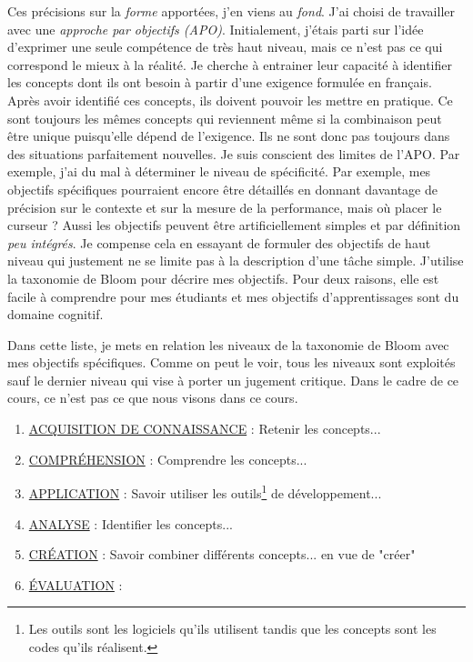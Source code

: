 Ces précisions sur la \emph{forme} apportées, j'en viens au \emph{fond}. J'ai choisi de travailler avec une \emph{approche par objectifs (APO)}. Initialement, j’étais parti sur l’idée d’exprimer une seule compétence de très haut niveau, mais ce n'est pas ce qui correspond le mieux à la réalité. Je cherche à entrainer leur capacité à identifier les concepts dont ils ont besoin à partir d'une exigence formulée en français. Après avoir identifié ces concepts, ils doivent pouvoir les mettre en pratique. Ce sont toujours les mêmes concepts qui reviennent même si la combinaison peut être unique puisqu'elle dépend de l'exigence. Ils ne sont donc pas toujours dans des situations parfaitement nouvelles. Je suis conscient des limites de l'APO. Par exemple, j'ai du mal à déterminer le niveau de spécificité. Par exemple, mes objectifs spécifiques pourraient encore être détaillés en donnant davantage de précision sur le contexte et sur la mesure de la performance, mais où placer le curseur ? Aussi les objectifs peuvent être artificiellement simples et par définition \emph{peu intégrés}. Je compense cela en essayant de formuler des objectifs de haut niveau qui justement ne se limite pas à la description d'une tâche simple. J'utilise la taxonomie de Bloom pour décrire mes objectifs. Pour deux raisons, elle est facile à comprendre pour mes étudiants et mes objectifs d'apprentissages sont du domaine cognitif.

Dans cette liste, je mets en relation les niveaux de la taxonomie de Bloom avec mes objectifs spécifiques. Comme on peut le voir, tous les niveaux sont exploités sauf le dernier niveau qui vise à porter un jugement critique. Dans le cadre de ce cours, ce n'est pas ce que nous visons dans ce cours.
\begin{enumerate}
    \item \underline{ACQUISITION DE CONNAISSANCE} : Retenir les concepts...
    \item \underline{COMPRÉHENSION} : Comprendre les concepts...
    \item \underline{APPLICATION} : Savoir utiliser les outils\footnote{Les outils sont les logiciels qu'ils utilisent tandis que les concepts sont les codes qu'ils réalisent.} de développement...
    \item \underline{ANALYSE} : Identifier les concepts...
    \item \underline{CRÉATION} : Savoir combiner différents concepts... en vue de "créer"
    \item \underline{ÉVALUATION} :
\end{enumerate}


